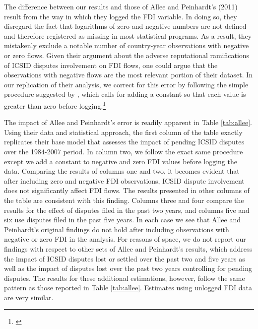 \documentclass[12pt,onesided]{amsart}
\begin{document}
The difference between our results and those of Allee and Peinhardt's (2011) result from the way in which they logged the FDI variable. In doing so, they disregard the fact that logarithms of zero and negative numbers are not defined and therefore registered as missing in most statistical programs. As a result, they mistakenly exclude a notable number of country-year observations with negative or zero flows. Given their argument about the adverse reputational ramifications of ICSID disputes involvement on FDI flows, one could argue that the observations with negative flows are the most relevant portion of their dataset. In our replication of their analysis, we correct for this error by following the simple procedure suggested by \citeauthor{li:2009}, which calls for adding a constant so that each value is greater than zero before logging.\footnote{\citet{li:2009}} 

The impact of Allee and Peinhardt's error is readily apparent in Table \ref{tab:allee}. Using their data and statistical approach, the first column of the table exactly replicates their base model that assesses the impact of pending ICSID disputes over the 1984-2007 period. In column two, we follow the exact same procedure except we add a constant to negative and zero FDI values before logging the data. Comparing the results of columns one and two, it becomes evident that after including zero and negative FDI observations, ICSID dispute involvement does not significantly affect FDI flows. The results presented in other columns of the table are consistent with this finding. Columns three and four compare the results for the effect of disputes filed in the past two years, and columns five and six use disputes filed in the past five years. In each case we see that Allee and Peinhardt's original findings do not hold after including observations with negative or zero FDI in the analysis. For reasons of space, we do not report our findings with respect to other sets of Allee and Peinhardt's results, which address the impact of ICSID disputes lost or settled over the past two and five years as well as the impact of disputes lost over the past two years controlling for pending disputes. The results for these additional estimations, however, follow the same pattern as those reported in Table \ref{tab:allee}. Estimates using unlogged FDI data are very similar. 

\end{document}

